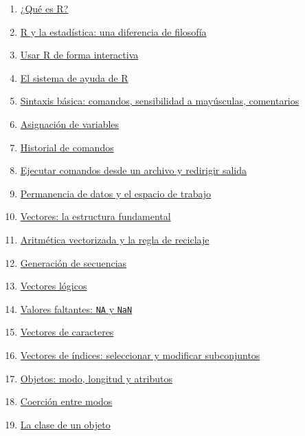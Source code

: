\documentclass[
  jou,
  floatsintext,
  longtable,
  a4paper,
  nolmodern,
  notxfonts,
  notimes,
  12pt,
  colorlinks=true,linkcolor=blue,citecolor=blue,urlcolor=blue]{apa7}
\providecommand{\tightlist}{%
  \setlength{\itemsep}{0pt}\setlength{\parskip}{0pt}}
\begin{document}
\begin{enumerate}
\def\labelenumi{\arabic{enumi}.}
\tightlist
\item
  \hyperref[1-quuxe9-es-r]{¿Qué es R?}
\item
  \hyperref[2-r-y-la-estaduxedstica-una-diferencia-de-filosofuxeda]{R y
  la estadística: una diferencia de filosofía}
\item
  \hyperref[3-usar-r-de-forma-interactiva]{Usar R de forma interactiva}
\item
  \hyperref[4-el-sistema-de-ayuda-de-r]{El sistema de ayuda de R}
\item
  \hyperref[5-sintaxis-buxe1sica-comandos-sensibilidad-a-mayuxfasculas-comentarios]{Sintaxis
  básica: comandos, sensibilidad a mayúsculas, comentarios}
\item
  \hyperref[6-asignaciuxf3n-de-variables]{Asignación de variables}
\item
  \hyperref[7-historial-de-comandos]{Historial de comandos}
\item
  \hyperref[8-ejecutar-comandos-desde-un-archivo-y-redirigir-salida]{Ejecutar
  comandos desde un archivo y redirigir salida}
\item
  \hyperref[9-permanencia-de-datos-y-el-espacio-de-trabajo]{Permanencia
  de datos y el espacio de trabajo}
\item
  \hyperref[10-vectores-la-estructura-fundamental]{Vectores: la
  estructura fundamental}
\item
  \hyperref[11-aritmuxe9tica-vectorizada-y-la-regla-de-reciclaje]{Aritmética
  vectorizada y la regla de reciclaje}
\item
  \hyperref[12-generaciuxf3n-de-secuencias]{Generación de secuencias}
\item
  \hyperref[13-vectores-luxf3gicos]{Vectores lógicos}
\item
  \hyperref[14-valores-faltantes-na-y-nan]{Valores faltantes:
  \texttt{NA} y \texttt{NaN}}
\item
  \hyperref[15-vectores-de-caracteres]{Vectores de caracteres}
\item
  \hyperref[16-vectores-de-uxedndices-seleccionar-y-modificar-subconjuntos]{Vectores
  de índices: seleccionar y modificar subconjuntos}
\item
  \hyperref[17-objetos-modo-longitud-y-atributos]{Objetos: modo,
  longitud y atributos}
\item
  \hyperref[18-coerciuxf3n-entre-modos]{Coerción entre modos}
\item
  \hyperref[19-la-clase-de-un-objeto]{La clase de un objeto}

\end{enumerate}
\end{document}
